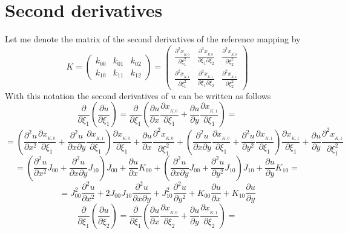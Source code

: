 \documentclass[a4paper,12pt]{article}
\begin{document}
\section{Second derivatives}
Let me denote the matrix of the second derivatives of the reference mapping by
$$K =
\left(\begin{array}{ccc}
k_{00} & k_{01} & k_{02}\\[3mm]
k_{10} & k_{11} & k_{12}
\end{array}\right) = 
\left(\begin{array}{ccc}
\frac{\partial^2 x_{_{K,0}}}{\partial \xi_1^2} & \frac{\partial^2 x_{_{K,0}}}{\partial \xi_1 \partial \xi_2} & \frac{\partial^2 x_{_{K,0}}}{\partial \xi_2^2}  \\[3mm]
\frac{\partial^2 x_{_{K,1}}}{\partial \xi_1^2} & \frac{\partial^2 x_{_{K,1}}}{\partial \xi_1 \partial \xi_2}& \frac{\partial^2 x_{_{K,1}}}{\partial \xi_2^2} 
\end{array}\right)
$$
With this notation the second derivatives of $u$ can be written as follows
$$\frac{\partial}{\partial \xi_1}\left(\frac{\partial u}{\partial \xi_1} \right) = \frac{\partial}{\partial \xi_1}\left( \frac{\partial u}{\partial x} \frac{\partial x_{_{K,0}}}{\partial \xi_1} + \frac{\partial u}{\partial y} \frac{\partial x_{_{K,1}}}{\partial \xi_1} \right) =$$
$$= \left(\frac{\partial^2 u}{\partial x^2} \frac{\partial x_{_{K,0}}}{\partial \xi_1} + \frac{\partial^2 u}{\partial x \partial y} \frac{\partial x_{_{K,1}}}{\partial \xi_1} \right) \frac{\partial x_{_{K,0}}}{\partial \xi_1} + \frac{\partial u}{\partial x} \frac{\partial^2 x_{_{K,0}}}{\partial \xi_1^2} +  \left(\frac{\partial^2 u}{\partial x \partial y} \frac{\partial x_{_{K,0}}}{\partial \xi_1} + \frac{\partial^2 u}{\partial y^2} \frac{\partial x_{_{K,1}}}{\partial \xi_1} \right) \frac{\partial x_{_{K,1}}}{\partial \xi_1} + \frac{\partial u}{\partial y} \frac{\partial^2 x_{_{K,1}}}{\partial \xi_1^2}$$
$$= \left(\frac{\partial^2 u}{\partial x^2} J_{00} + \frac{\partial^2 u}{\partial x \partial y} J_{10} \right) J_{00} + \frac{\partial u}{\partial x} K_{00}  + \left(\frac{\partial^2 u}{\partial x \partial y} J_{00} + \frac{\partial^2 u}{\partial y^2} J_{10} \right) J_{10} + \frac{\partial u}{\partial y} K_{10} = $$
$$ = J_{00}^2 \frac{\partial^2 u}{\partial x^2} +  2 J_{00} J_{10}\frac{\partial^2 u}{\partial x \partial y} + J_{10}^2 \frac{\partial^2 u}{\partial y^2} +  K_{00} \frac{\partial u}{\partial x} +  K_{10} \frac{\partial u}{\partial y}
$$
\vspace*{5mm}
$$\frac{\partial}{\partial \xi_1}\left(\frac{\partial u}{\partial \xi_2} \right) = \frac{\partial}{\partial \xi_1}\left( \frac{\partial u}{\partial x} \frac{\partial x_{_{K,0}}}{\partial \xi_2} + \frac{\partial u}{\partial y} \frac{\partial x_{_{K,1}}}{\partial \xi_2} \right) =$$
\end{document}
